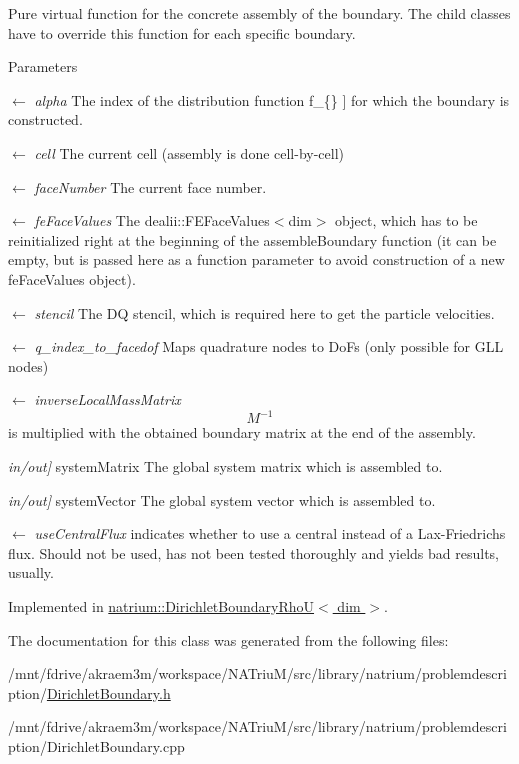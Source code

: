 Pure virtual function for the concrete assembly of the boundary. The child classes have to override this function for each specific boundary. 
\begin{DoxyParams}{Parameters}
\item[\mbox{$\leftarrow$} {\em alpha}]The index of the distribution function  f\_\-\{\} \mbox{]} for which the boundary is constructed. \item[\mbox{$\leftarrow$} {\em cell}]The current cell (assembly is done cell-\/by-\/cell) \item[\mbox{$\leftarrow$} {\em faceNumber}]The current face number. \item[\mbox{$\leftarrow$} {\em feFaceValues}]The dealii::FEFaceValues$<$dim$>$ object, which has to be reinitialized right at the beginning of the assembleBoundary function (it can be empty, but is passed here as a function parameter to avoid construction of a new feFaceValues object). \item[\mbox{$\leftarrow$} {\em stencil}]The DQ stencil, which is required here to get the particle velocities. \item[\mbox{$\leftarrow$} {\em q\_\-index\_\-to\_\-facedof}]Maps quadrature nodes to DoFs (only possible for GLL nodes) \item[\mbox{$\leftarrow$} {\em inverseLocalMassMatrix}]\[ M^{-1} \] is multiplied with the obtained boundary matrix at the end of the assembly. \item[{\em in/out\mbox{]}}]systemMatrix The global system matrix which is assembled to. \item[{\em in/out\mbox{]}}]systemVector The global system vector which is assembled to. \item[\mbox{$\leftarrow$} {\em useCentralFlux}]indicates whether to use a central instead of a Lax-\/Friedrichs flux. Should not be used, has not been tested thoroughly and yields bad results, usually. \end{DoxyParams}


Implemented in \hyperlink{classnatrium_1_1DirichletBoundaryRhoU_a9fecb00df16c4294d9852222ddbdb4ca}{natrium::DirichletBoundaryRhoU$<$ dim $>$}.

The documentation for this class was generated from the following files:\begin{DoxyCompactItemize}
\item 
/mnt/fdrive/akraem3m/workspace/NATriuM/src/library/natrium/problemdescription/\hyperlink{DirichletBoundary_8h}{DirichletBoundary.h}\item 
/mnt/fdrive/akraem3m/workspace/NATriuM/src/library/natrium/problemdescription/DirichletBoundary.cpp\end{DoxyCompactItemize}
